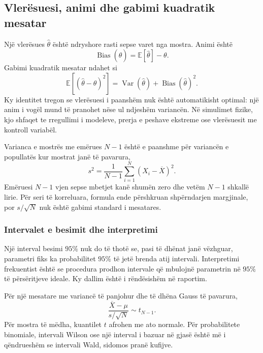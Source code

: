 \documentclass[11pt,oneside,openany]{book}
\newcommand{\E}{\mathbb{E}}
\newcommand{\Var}{\operatorname{Var}}
\begin{document}


\subsection{Vlerësuesi, animi dhe gabimi kuadratik mesatar}
Një vlerësues $\widehat\theta$ është ndryshore rasti sepse varet nga mostra. Animi është
\begin{equation}
 \operatorname{Bias}(\widehat\theta)=\E[\widehat\theta]-\theta.
\end{equation}
Gabimi kuadratik mesatar ndahet si
\begin{equation}
 \E[(\widehat\theta-\theta)^2]
 =\Var(\widehat\theta)+\operatorname{Bias}(\widehat\theta)^2.
\end{equation}
Ky identitet tregon se vlerësuesi i paanshëm nuk është automatikisht optimal: një anim i vogël mund të pranohet nëse ul ndjeshëm variancën. Në simulimet fizike, kjo shfaqet te rregullimi i modeleve, prerja e peshave ekstreme ose vlerësuesit me kontroll variabël.

Varianca e mostrës me emërues $N-1$ është e paanshme për variancën e popullatës kur mostrat janë të pavarura,
\begin{equation}
 s^2=\frac{1}{N-1}\sum_{i=1}^{N}(X_i-\overline X)^2.
\end{equation}
Emëruesi $N-1$ vjen sepse mbetjet kanë shumën zero dhe vetëm $N-1$ shkallë lirie. Për seri të korreluara, formula ende përshkruan shpërndarjen margjinale, por $s/\sqrt N$ nuk është gabimi standard i mesatares.

\subsubsection{Intervalet e besimit dhe interpretimi}
Një interval besimi $95\%$ nuk do të thotë se, pasi të dhënat janë vëzhguar, parametri fiks ka probabilitet $95\%$ të jetë brenda atij intervali. Interpretimi frekuentist është se procedura prodhon intervale që mbulojnë parametrin në $95\%$ të përsëritjeve ideale. Ky dallim është i rëndësishëm në raportim.

Për një mesatare me variancë të panjohur dhe të dhëna Gauss të pavarura,
\begin{equation}
 \frac{\overline X-\mu}{s/\sqrt N}\sim t_{N-1}.
\end{equation}
Për mostra të mëdha, kuantilet $t$ afrohen me ato normale. Për probabilitete binomiale, intervali Wilson ose një interval i bazuar në gjasë është më i qëndrueshëm se intervali Wald, sidomos pranë kufijve.
\end{document}
